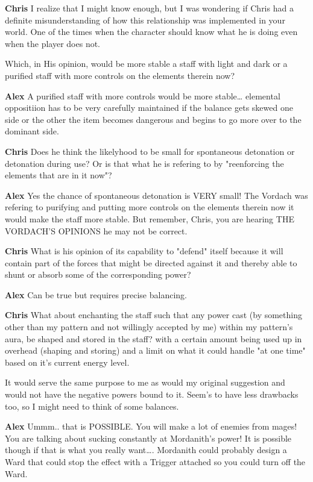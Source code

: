 {\bf Chris} 
I realize that I might know enough, but I was wondering if Chris had a 
definite misunderstanding of how this relationship was implemented in 
your world. One of the times when the character should know what he 
is doing even when the player does not.

Which, in His opinion, would be more stable a staff with light and dark 
or a purified staff with more controls on the elements therein now?

{\bf Alex }
A purified staff with more controls would be more stable\dots 
elemental oppositiion has to be very carefully maintained\- if 
the balance gets skewed one side or the other the item becomes 
dangerous and begins to go more over to the dominant side.

{\bf Chris} 
Does he think the likelyhood to be small for spontaneous detonation or 
detonation during use? Or is that what he is refering to by 
"re\-enforcing the elements that are in it now"?

{\bf Alex }
Yes\- the chance of spontaneous detonation is VERY small! The Vordach 
was refering to purifying and putting more controls on the elements 
therein now\- it would make the staff more stable. But remember, Chris, you 
are hearing THE VORDACH'S OPINIONS\- he may not be correct.

{\bf Chris} 
What is his opinion of its capability to "defend" itself because it 
will contain part of the forces that might be directed against it and 
thereby able to shunt or absorb some of the corresponding power?

{\bf Alex }
Can be true but requires precise balancing.

{\bf Chris} 
What about enchanting the staff such that any power cast 
(by something other than my pattern and not willingly accepted by me) 
within my pattern's aura, be shaped and stored in the staff? with a 
certain amount being used up in 
overhead (shaping and storing) and a limit on what it could handle 
"at one time" based on it's current energy level. 

It would serve the same purpose to me as would my original suggestion and 
would not have the negative powers bound to it. Seem's to have less 
drawbacks too, so I might need to think of some balances.

{\bf Alex }
Ummm.. that is POSSIBLE. You will make a lot of enemies from mages! 
You are talking about sucking constantly at Mordanith's power! It is possible 
though if that is what you really want\dots. Mordanith could probably design 
a Ward that could stop the effect with a Trigger attached so you could turn 
off the Ward.

